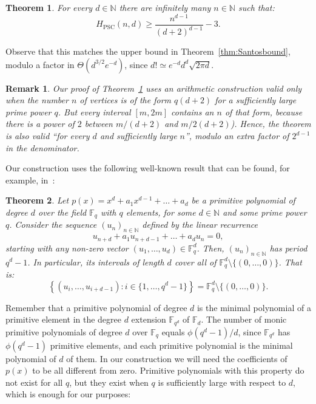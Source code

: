 \documentclass[12pt,a4paper]{article}
\newcommand{\PSC}{{\textrm{PSC}}}
\newcommand{\F}{\mathbb F}
\newcommand{\N}{\mathbb N}
\theoremstyle{plain}
\newtheorem{theorem}{Theorem}
\newtheorem*{remark}{Remark}
\theoremstyle{definition}
\begin{document}
\begin{theorem}
\label{thm:pure_complexes}
For every $d\in \N$ there are infinitely many $n\in\N$ such that:
\[
  H_\PSC(n,d) \ge \frac{n^{d-1}}{(d+2)^{d-1}}-3.
\]
\end{theorem}
Observe that this matches the upper bound in Theorem~\ref{thm:Santosbound}, modulo a factor %
in $\Theta(d^{3/2}e^{-d})$, since $d!\simeq e^{-d}d^d \sqrt{2\pi d}$.

\begin{remark}
Our proof of Theorem~\ref{thm:pure_complexes} uses an arithmetic construction valid only when the number $n$ of vertices is of the form $q(d+2)$ for a sufficiently large prime power $q$. 
But every interval $[m,2m]$ contains an $n$ of that form, because there is a power of $2$ between $m/(d+2)$ and $m/2(d+2)$). 
Hence, the theorem is also valid ``for every $d$ and sufficiently large $n$'', modulo an extra factor of $2^{d-1}$ in the denominator.
\end{remark}

Our construction uses the following well-known result that can be found, for example, in~\cite[Theorem 33.16]{LidlPilz}:

\begin{theorem}
\label{thm:sequence}
Let $p(x) = x^{d} + a_1 x^{d-1} +\dots+ a_d$ be a primitive polynomial of degree $d$ over the field $\F_q$ with $q$ elements, for some $d\in \N$ and some prime power $q$. Consider the sequence $(u_n)_{n\in \N}$ defined by the linear recurrence
\[
u_{n+d} + a_1 u_{n+d-1} +\dots+ a_d u_n =0,
\]
starting with any non-zero vector $(u_1, \dots,u_{d}) \in \F_q^d$. Then, $(u_n)_{n\in \N}$ has period $q^d-1$. In particular, its intervals of length $d$ cover all of $ \F_q^d\setminus \{(0,\dots,0)\}$. That is:
\[
\left\{(u_i,\dots,u_{i+d-1}) : i\in \{1,\dots, q^d-1\} \right\}= \F_q^d \setminus \{(0,\dots,0)\}.
\]
\end{theorem}

Remember that a primitive polynomial of degree $d$ is the minimal polynomial of a primitive element in the degree $d$ extension $\F_{q^d}$ of $\F_d$. The number of monic primitive polynomials of degree $d$ over $\F_q$ equals $\phi(q^d-1)/d$, since $\F_{q^d}$ has $\phi(q^d-1)$ primitive elements, and each primitive polynomial is the minimal polynomial of $d$ of them.
In our construction we will need the coefficients of $p(x)$ to be all different from zero. Primitive polynomials with this property do not exist for all $q$, but they exist when $q$ is sufficiently large with respect to $d$, which is enough for our purposes:
\end{document}
